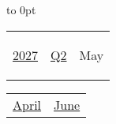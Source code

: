 \vbox to 0pt{}


\pagebreak
{\noindent\Large\renewcommand{\arraystretch}{\myNumArrayStretch}\begin{tabular}{|l|l|l}
\hyperlink{2027}{2027} & \hyperlink{Q2}{Q2} & \hypertarget{May}{May}
\end{tabular}\hfill%
\begin{tabular}{r|r@{}}
\hyperlink{April}{April} & \hyperlink{June}{June}
\end{tabular}}
\myLineThick\medskip

{%

\setlength{\tabcolsep}{\myLenTabColSep}%
%
\begin{tabularx}{\linewidth}{|l!{\vrule width \myLenLineThicknessThick}*{7}{@{}X@{}|}}
  

\end{tabularx}}
